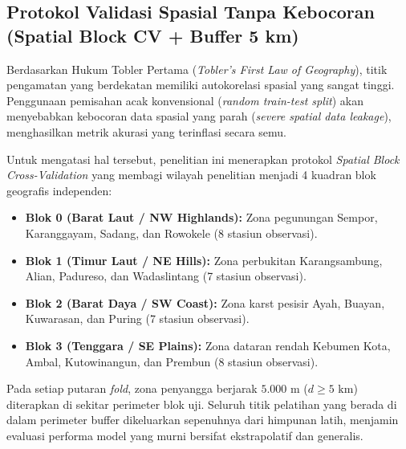 \documentclass[11pt,a4paper,titlepage]{article}
\begin{document}
\subsection{Protokol Validasi Spasial Tanpa Kebocoran (Spatial Block CV + Buffer 5 km)}
Berdasarkan Hukum Tobler Pertama (\textit{Tobler's First Law of Geography}), titik pengamatan yang berdekatan memiliki autokorelasi spasial yang sangat tinggi. Penggunaan pemisahan acak konvensional (\textit{random train-test split}) akan menyebabkan kebocoran data spasial yang parah (\textit{severe spatial data leakage}), menghasilkan metrik akurasi yang terinflasi secara semu.

Untuk mengatasi hal tersebut, penelitian ini menerapkan protokol \textit{Spatial Block Cross-Validation} yang membagi wilayah penelitian menjadi 4 kuadran blok geografis independen:
\begin{itemize}
    \item \textbf{Blok 0 (Barat Laut / NW Highlands):} Zona pegunungan Sempor, Karanggayam, Sadang, dan Rowokele (8 stasiun observasi).
    \item \textbf{Blok 1 (Timur Laut / NE Hills):} Zona perbukitan Karangsambung, Alian, Padureso, dan Wadaslintang (7 stasiun observasi).
    \item \textbf{Blok 2 (Barat Daya / SW Coast):} Zona karst pesisir Ayah, Buayan, Kuwarasan, dan Puring (7 stasiun observasi).
    \item \textbf{Blok 3 (Tenggara / SE Plains):} Zona dataran rendah Kebumen Kota, Ambal, Kutowinangun, dan Prembun (8 stasiun observasi).
\end{itemize}
Pada setiap putaran \textit{fold}, zona penyangga berjarak $5.000\text{ m}$ ($d \ge 5\text{ km}$) diterapkan di sekitar perimeter blok uji. Seluruh titik pelatihan yang berada di dalam perimeter buffer dikeluarkan sepenuhnya dari himpunan latih, menjamin evaluasi performa model yang murni bersifat ekstrapolatif dan generalis.
\end{document}
